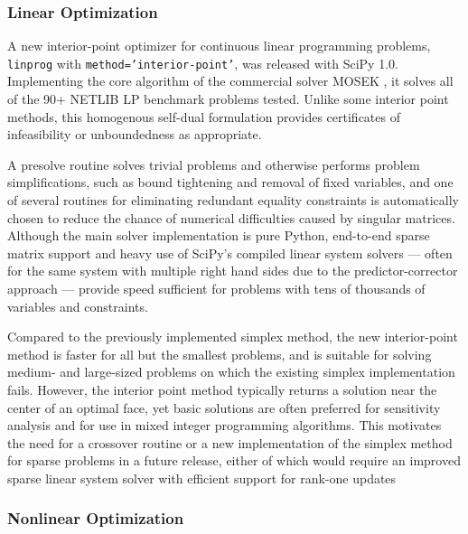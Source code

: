 \subsubsection*{Linear Optimization}

A new interior-point optimizer for continuous linear programming problems, \texttt{linprog} with \texttt{method='interior-point'}, was released with SciPy 1.0. Implementing the core algorithm of the commercial solver MOSEK \cite{andersen2000mosek}, it solves all of the 90+ NETLIB LP benchmark problems \cite{netlib} tested. Unlike some interior point methods, this homogenous self-dual formulation provides certificates of infeasibility or unboundedness as appropriate. 

A presolve routine \cite{andersen1995presolving} solves trivial problems and otherwise performs problem simplifications, such as bound tightening and removal of fixed variables, and one of several routines for eliminating redundant equality constraints is automatically chosen to reduce the chance of numerical difficulties caused by singular matrices. Although the main solver implementation is pure Python, end-to-end sparse matrix support and heavy use of SciPy's compiled linear system solvers --- often for the same system with multiple right hand sides due to the predictor-corrector approach --- provide speed sufficient for problems with tens of thousands of variables and constraints.

Compared to the previously implemented simplex method, the new interior-point method is faster for all but the smallest problems, and is suitable for solving medium- and large-sized problems on which the existing simplex implementation fails. However, the interior point method typically returns a solution near the center of an optimal face, yet basic solutions are often preferred for sensitivity analysis and for use in mixed integer programming algorithms. This motivates the need for a crossover routine or a new implementation of the simplex method for sparse problems in a future release, either of which would require an improved sparse linear system solver with efficient support for rank-one updates

\subsubsection*{Nonlinear Optimization}


